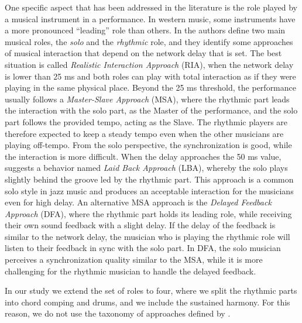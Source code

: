 One specific aspect that has been addressed in the literature is the role played by a musical instrument in a performance. In western music, some instruments have a more pronounced ``leading'' role than others. In \cite{Carot07networkmusic} the authors define two main musical roles, the \textit{solo} and the \textit{rhythmic} role, and they identify some approaches of musical interaction that depend on the network delay that is set. The best situation is called \textit{Realistic Interaction Approach} (RIA), when the network delay is lower than 25 ms and both roles can play with total interaction as if they were playing in the same physical place. Beyond the 25 ms threshold, the performance usually follows a \textit{Master-Slave Approach} (MSA), where the rhythmic part leads the interaction with the solo part, as the Master of the performance, and the solo part follows the provided tempo, acting as the Slave. The rhythmic players are therefore expected to keep a steady tempo even when the other musicians are playing off-tempo. From the solo perspective, the synchronization is good, while the interaction is more difficult. When the delay approaches the 50 ms value, \cite{Carot07networkmusic} suggests a behavior named \textit{Laid Back Approach} (LBA), whereby the solo plays slightly behind the groove led by the rhythmic part. This approach is a common solo style in jazz music and produces an acceptable interaction for the musicians even for high delay. An alternative MSA approach is the \textit{Delayed Feedback Approach} (DFA), where the rhythmic part holds its leading role, while receiving their own sound feedback with a slight delay. If the delay of the feedback is similar to the network delay, the musician who is playing the rhythmic role will listen to their feedback in sync with the solo part. In DFA, the solo musician perceives a synchronization quality similar to the MSA, while it is more challenging for the rhythmic musician to handle the delayed feedback. 

In our study we extend the set of roles to four, where we split the rhythmic parts into chord comping and drums, and we include the sustained harmony. For this reason, we do not use the taxonomy of approaches defined by \cite{Carot07networkmusic}.



